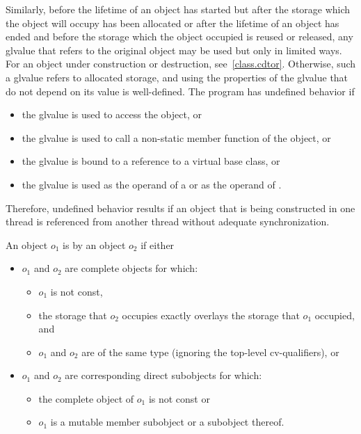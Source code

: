 \pnum
Similarly, before the lifetime of an object has started but after the
storage which the object will occupy has been allocated or after the
lifetime of an object has ended and before the storage which the object
occupied is reused or released, any glvalue that refers to the original
object may be used but only in limited ways.
For an object under construction or destruction, see~\ref{class.cdtor}.
Otherwise, such
a glvalue refers to
allocated storage, and using the
properties of the glvalue that do not depend on its value is
well-defined. The program has undefined behavior if
\begin{itemize}
\item the glvalue is used to access the object, or
\item the glvalue is used to call a non-static member function of the object, or
\item the glvalue is bound to a reference to a virtual base class, or
\item the glvalue is used as the operand of a
 or as the operand of
.
\end{itemize}

\begin{note}
Therefore, undefined behavior results
if an object that is being constructed in one thread is referenced from another
thread without adequate synchronization.
\end{note}

\pnum
An object $o_1$ is  by an object $o_2$ if either
\begin{itemize}
\item
$o_1$ and $o_2$ are complete objects for which:
\begin{itemize}
\item $o_1$ is not const,
\item the storage that $o_2$ occupies exactly overlays
the storage that $o_1$ occupied, and
\item $o_1$ and $o_2$ are of the same type
(ignoring the top-level cv-qualifiers), or
\end{itemize}

\item
$o_1$ and $o_2$ are corresponding direct subobjects for which:
\begin{itemize}
\item the complete object of $o_1$ is not const or
\item $o_1$ is a mutable member subobject or a subobject thereof.
\end{itemize}
\end{itemize}


